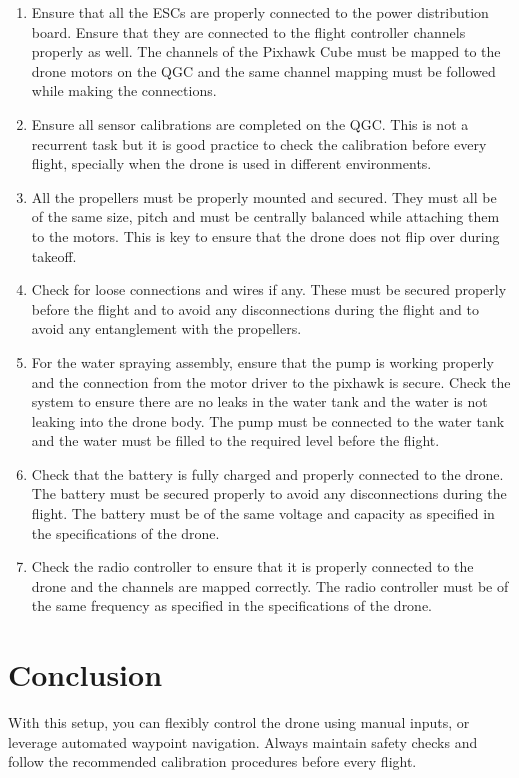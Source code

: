 \documentclass[12pt,a4paper]{article}
\begin{document}
\begin{enumerate}
    \item Ensure that all the ESCs are properly connected to the power distribution board. Ensure that they are connected to the flight controller channels properly as well. The channels of the Pixhawk Cube must be mapped to the drone motors on the QGC and the same channel mapping must be followed while making the connections.
    \item Ensure all sensor calibrations are completed on the QGC. This is not a recurrent task but it is good practice to check the calibration before every flight, specially when the drone is used in different environments.
    \item All the propellers must be properly mounted and secured. They must all be of the same size, pitch and must be centrally balanced while attaching them to the motors. This is key to ensure that the drone does not flip over during takeoff.
    \item Check for loose connections and wires if any. These must be secured properly before the flight and to avoid any disconnections during the flight and to avoid any entanglement with the propellers.
    \item For the water spraying assembly, ensure that the pump is working properly and the connection from the motor driver to the pixhawk is secure. Check the system to ensure there are no leaks in the water tank and the water is not leaking into the drone body. The pump must be connected to the water tank and the water must be filled to the required level before the flight. 
    \item Check that the battery is fully charged and properly connected to the drone. The battery must be secured properly to avoid any disconnections during the flight. The battery must be of the same voltage and capacity as specified in the specifications of the drone.
    \item Check the radio controller to ensure that it is properly connected to the drone and the channels are mapped correctly. The radio controller must be of the same frequency as specified in the specifications of the drone.
\end{enumerate}

\section{Conclusion}
With this setup, you can flexibly control the drone using manual inputs, or leverage automated waypoint navigation. Always maintain safety checks and follow the recommended calibration procedures before every flight.
\end{document}
